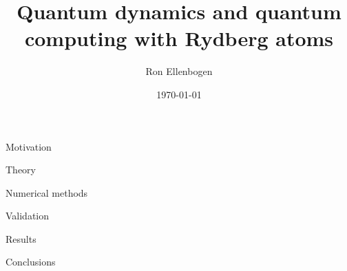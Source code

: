 \documentclass[aspectratio=169]{beamer}
\title{Quantum dynamics and quantum computing with Rydberg atoms}
\author{Ron Ellenbogen}
\institute{Department of Physics, Durham University}
\date{\today}
\begin{document}
\begin{frame}
  \titlepage
\end{frame}

\begin{frame}{Motivation}
\end{frame}

\begin{frame}{Theory}
\end{frame}

\begin{frame}{Numerical methods}
\end{frame}

\begin{frame}{Validation}
\end{frame}

\begin{frame}{Results}
\end{frame}

\begin{frame}{Conclusions}
\end{frame}
\end{document}
